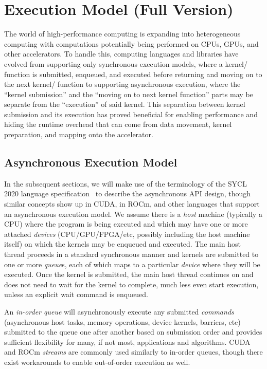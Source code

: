 
\iffalse
\section{Execution Model (Full Version)}
\label{sec:async_api}

The world of high-performance computing is expanding into heterogeneous computing with computations potentially being performed on CPUs, GPUs, and other accelerators. To handle this, computing languages and libraries have evolved from supporting only synchronous execution models, where a kernel/ function is submitted, enqueued, and executed before returning and moving on to the next kernel/ function to supporting asynchronous execution, where the ``kernel submission'' and the ``moving on to next kernel function'' parts may be separate from the ``execution'' of said kernel. This separation between kernel submission and its execution has proved beneficial for enabling performance and hiding the runtime overhead that can come from data movement, kernel preparation, and mapping onto the accelerator.

\subsection{Asynchronous Execution Model}

In the subsequent sections, we will make use of the terminology of the SYCL 2020 language specification~\cite{SYCL2020Specification} to describe the asynchronous API design, though similar concepts show up in CUDA, in ROCm, and other languages that support an asynchronous execution model. We assume there is a \textit{host} machine (typically a CPU) where the program is being executed and which may have one or more attached \textit{devices} (CPU/GPU/FPGA/etc, possibly including the host machine itself) on which the kernels may be enqueued and executed. The main host thread proceeds in a standard synchronous manner and kernels are submitted to one or more \textit{queue}s, each of which maps to a particular \textit{device} where they will be executed. Once the kernel is submitted, the main host thread continues on and does not need to wait for the kernel to complete, much less even start execution, unless an explicit wait command is enqueued. 

An \textit{in-order queue} will asynchronously execute any submitted \textit{commands} (asynchronous host tasks, memory operations, device kernels, barriers, etc) submitted to the queue one after another based on submission order and provides sufficient flexibility for many, if not most, applications and algorithms. CUDA and ROCm \textit{streams} are commonly used similarly to in-order queues, though there exist workarounds to enable out-of-order execution as well. 

